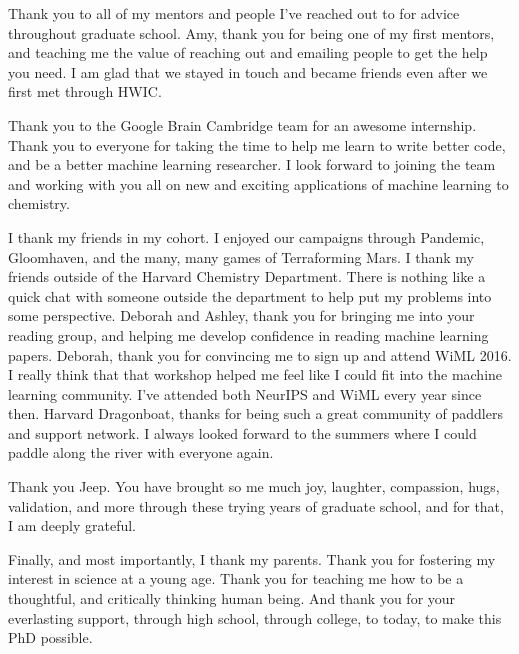 Thank you to all of my mentors and people I've reached out to for advice throughout graduate school. Amy, thank you for being one of my first mentors, and teaching me the value of reaching out and emailing people to get the help you need. I am glad that we stayed in touch and became friends even after we first met through HWIC.

Thank you to the Google Brain Cambridge team for an awesome internship. Thank you to everyone for taking the time to help me learn to write better code, and be a better machine learning researcher. I look forward to joining the team and working with you all on new and exciting applications of machine learning to chemistry.

I thank my friends in my cohort. I enjoyed our campaigns through Pandemic, Gloomhaven, and the many, many games of Terraforming Mars.
I thank my friends outside of the Harvard Chemistry Department. There is nothing like a quick chat with someone outside the department to help put my problems into some perspective.
Deborah and Ashley, thank you for bringing me into your reading group, and helping me develop confidence in reading machine learning papers. Deborah, thank you for convincing me to sign up and attend WiML 2016.
I really think that that workshop helped me feel like I could fit into the machine learning community. I've attended both NeurIPS and WiML every year since then.
Harvard Dragonboat, thanks for being such a great community of paddlers and support network. I always looked forward to the summers where I could paddle along the river with everyone again.

Thank you Jeep. You have brought so me much joy, laughter, compassion, hugs, validation, and more through these trying years of graduate school, and for that, I am deeply grateful.

Finally, and most importantly, I thank my parents. Thank you for fostering my interest in science at a young age. Thank you for teaching me how to be a thoughtful, and critically thinking human being. And thank you for your everlasting support, through high school, through college, to today, to make this PhD possible. 
